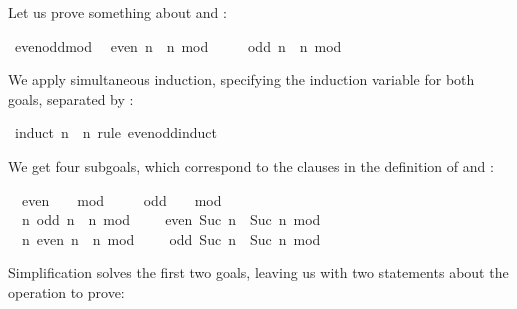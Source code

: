 \begin{isabellebody}
\begin{isamarkuptext}
  Let us prove something about  and :%
\end{isamarkuptext}%
\isamarkuptrue%
\isamarkupfalse%
\ even{\isacharunderscore}odd{\isacharunderscore}mod{}{\isacharcolon}\isanewline
\ \ {\isachardoublequoteopen}even\ n\ {\isacharequal}\ {\isacharparenleft}n\ mod\ {}\ {\isacharequal}\ {}{\isacharparenright}{\isachardoublequoteclose}\isanewline
\ \ {\isachardoublequoteopen}odd\ n\ {\isacharequal}\ {\isacharparenleft}n\ mod\ {}\ {\isacharequal}\ {}{\isacharparenright}{\isachardoublequoteclose}%
\isadelimproof
%
\endisadelimproof
%
\isatagproof
%
\begin{isamarkuptxt}%
We apply simultaneous induction, specifying the induction variable
  for both goals, separated by :%
\end{isamarkuptxt}%
\isamarkuptrue%
\isamarkupfalse%
\ {\isacharparenleft}induct\ n\ \ n\ rule{\isacharcolon}\ even{\isacharunderscore}odd{\isachardot}induct{\isacharparenright}%
\begin{isamarkuptxt}%
We get four subgoals, which correspond to the clauses in the
  definition of  and :
  \begin{isabelle}%
\ {}{\isachardot}\ even\ {}\ {\isacharequal}\ {\isacharparenleft}{}\ mod\ {}\ {\isacharequal}\ {}{\isacharparenright}\isanewline
\ {}{\isachardot}\ odd\ {}\ {\isacharequal}\ {\isacharparenleft}{}\ mod\ {}\ {\isacharequal}\ {}{\isacharparenright}\isanewline
\ {}{\isachardot}\ {\isasymAnd}n{\isachardot}\ odd\ n\ {\isacharequal}\ {\isacharparenleft}n\ mod\ {}\ {\isacharequal}\ {}{\isacharparenright}\ {\isasymLongrightarrow}\ even\ {\isacharparenleft}Suc\ n{\isacharparenright}\ {\isacharequal}\ {\isacharparenleft}Suc\ n\ mod\ {}\ {\isacharequal}\ {}{\isacharparenright}\isanewline
\ {}{\isachardot}\ {\isasymAnd}n{\isachardot}\ even\ n\ {\isacharequal}\ {\isacharparenleft}n\ mod\ {}\ {\isacharequal}\ {}{\isacharparenright}\ {\isasymLongrightarrow}\ odd\ {\isacharparenleft}Suc\ n{\isacharparenright}\ {\isacharequal}\ {\isacharparenleft}Suc\ n\ mod\ {}\ {\isacharequal}\ {}{\isacharparenright}%
\end{isabelle}
  Simplification solves the first two goals, leaving us with two
  statements about the  operation to prove:%

\end{isamarkuptxt}
\end{isabellebody}
